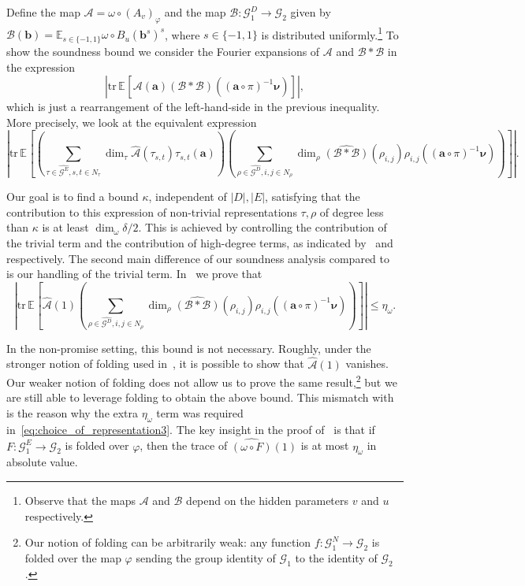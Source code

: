 \documentclass[a4paper,11pt]{article}
\theoremstyle{definition}
\newcommand{\tuple}[1]{{\mathbf{#1}}}
\newcommand{\ex}[1]{\mathbb{E}_{#1}}
\newcommand{\gr}{\mathscr{G}}
\newcommand{\tr}{\mathrm{tr}}
\newcommand{\A}{\mathcal{A}}
\newcommand{\B}{\mathcal{B}}
\begin{document}
Define the map
$\A= \omega\circ(A_v)_{\varphi}$ and
the map
$\B: \gr_1^D \rightarrow \gr_2$ given by $\B(\tuple{b}) = \ex{s\in \{-1,1\}} \omega \circ B_u(\tuple{b}^s)^s$, where $s\in \{-1, 1\}$ is distributed uniformly.\footnote{Observe that the maps $\A$ and $\B$ depend on the hidden parameters $v$ and $u$ respectively.} To show the soundness bound we consider the Fourier expansions of $\A$ and $\B*\B$ in the expression 
\[
\left|
\tr \, 
\ex{}\left[
\A(\tuple{a})
(\B*\B)( (\tuple{a} \circ \pi)^{-1}\bm{\nu}) 
\right]
\right|,\] which is just a rearrangement of the left-hand-side in the previous inequality. More precisely, we look at the equivalent expression 
\begin{equation}
\label{eq:choice_of_representation2}
\left|
\tr \, 
\ex{}\left[ 
\left(
\sum_{\tau\in \widehat{\gr^E}, s,t\in N_\tau}
\dim_\tau \widehat{\A}(\tau_{s,t}) \tau_{s,t}(\tuple{a})
\right)
\left(
\sum_{\rho\in \widehat{\gr^D}, i,j\in N_\rho}
\dim_\rho
\widehat{(\B*\B)}(\rho_{i,j})
\rho_{i,j}((\tuple{a} \circ \pi)^{-1}\bm{\nu}) \right)
\right]
\right|.
\end{equation}

 Our goal is to find a bound $\kappa$, independent of $|D|,|E|$, satisfying that the contribution to this expression of 
non-trivial representations $\tau, \rho$ of degree less than $\kappa$
is at least $\dim_\omega \delta/2$. This is achieved by controlling the contribution of the trivial term and the contribution of high-degree terms, as indicated by~ and~ respectively. 
The second main difference of our soundness analysis compared to~\cite{EHR04:tcs} is our handling of the trivial term. In~ we prove that 
\[ \left|
\tr \, 
\ex{}\left[ 
\widehat{\A}(1) 
\left(
\sum_{\rho\in \widehat{\gr^D}, i,j\in N_\rho}
\dim_\rho
\widehat{(\B*\B)}(\rho_{i,j})
\rho_{i,j}((\tuple{a} \circ \pi)^{-1}\bm{\nu}) \right)
\right]
\right| \leq \eta_\omega.
\]

In the non-promise setting, this bound is not necessary. Roughly, under the stronger notion of folding used in~\cite{EHR04:tcs}, it is possible to show that $\widehat{\A}(1)$ vanishes. Our weaker notion of folding does not allow us to prove the same result,\footnote{Our notion of folding can be arbitrarily weak: any function $f:\gr_1^N \rightarrow \gr_2$ is folded over the map $\varphi$ sending the group identity of $\gr_1$ to the identity of $\gr_2$.} but we are still able to leverage folding to obtain the above bound. This mismatch with~\cite{EHR04:tcs} is the reason why the extra $\eta_\omega$ term was required in~\eqref{eq:choice_of_representation3}. The key insight in the proof of~ is that if $F:\gr_1^E \rightarrow \gr_2$ is folded over $\varphi$, then the trace of $\widehat{(\omega \circ F)}(1)$ is at most $\eta_\omega$ in absolute value. \par
\end{document}
